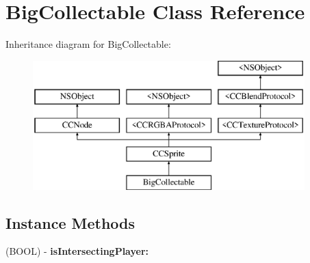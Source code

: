 \hypertarget{interface_big_collectable}{\section{Big\-Collectable Class Reference}
\label{interface_big_collectable}
}
Inheritance diagram for Big\-Collectable\-:\begin{figure}[H]
\begin{center}
\leavevmode
\includegraphics[height=5.000000cm]{interface_big_collectable}
\end{center}
\end{figure}
\subsection*{Instance Methods}
\begin{DoxyCompactItemize}
\item 
\hypertarget{interface_big_collectable_ac0bb0699c5c39db79d522e09968296a8}{(B\-O\-O\-L) -\/ {\bfseries is\-Intersecting\-Player\-:}}\label{interface_big_collectable_ac0bb0699c5c39db79d522e09968296a8}

\end{DoxyCompactItemize}
